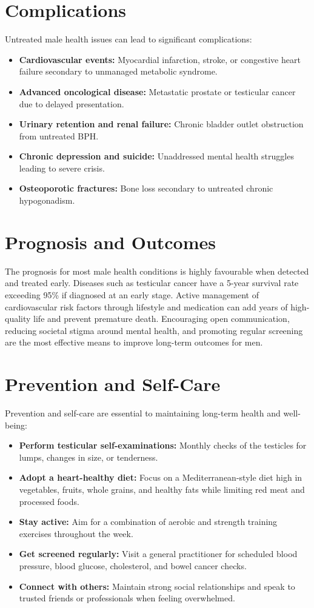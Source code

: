 \section*{Complications}
Untreated male health issues can lead to significant complications:
\begin{itemize}
    \item \textbf{Cardiovascular events:} Myocardial infarction, stroke, or congestive heart failure secondary to unmanaged metabolic syndrome.
    \item \textbf{Advanced oncological disease:} Metastatic prostate or testicular cancer due to delayed presentation.
    \item \textbf{Urinary retention and renal failure:} Chronic bladder outlet obstruction from untreated BPH.
    \item \textbf{Chronic depression and suicide:} Unaddressed mental health struggles leading to severe crisis.
    \item \textbf{Osteoporotic fractures:} Bone loss secondary to untreated chronic hypogonadism.
\end{itemize}

\section*{Prognosis and Outcomes}
The prognosis for most male health conditions is highly favourable when detected and treated early. Diseases such as testicular cancer have a 5-year survival rate exceeding 95\% if diagnosed at an early stage. Active management of cardiovascular risk factors through lifestyle and medication can add years of high-quality life and prevent premature death. Encouraging open communication, reducing societal stigma around mental health, and promoting regular screening are the most effective means to improve long-term outcomes for men.

\section*{Prevention and Self-Care}
Prevention and self-care are essential to maintaining long-term health and well-being:
\begin{itemize}
    \item \textbf{Perform testicular self-examinations:} Monthly checks of the testicles for lumps, changes in size, or tenderness.
    \item \textbf{Adopt a heart-healthy diet:} Focus on a Mediterranean-style diet high in vegetables, fruits, whole grains, and healthy fats while limiting red meat and processed foods.
    \item \textbf{Stay active:} Aim for a combination of aerobic and strength training exercises throughout the week.
    \item \textbf{Get screened regularly:} Visit a general practitioner for scheduled blood pressure, blood glucose, cholesterol, and bowel cancer checks.
    \item \textbf{Connect with others:} Maintain strong social relationships and speak to trusted friends or professionals when feeling overwhelmed.
\end{itemize}


